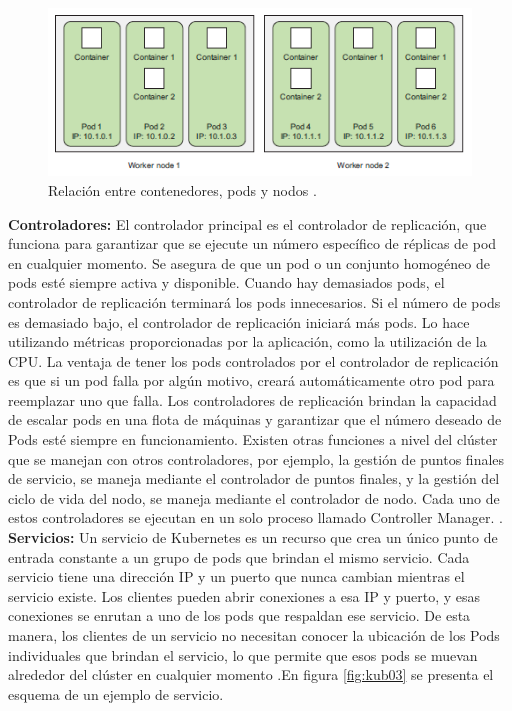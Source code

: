 \begin{figure}[htpb!]
	\centering
	\includegraphics[width=0.8\columnwidth]{images/kubernetes02.PNG}
	\caption{Relación entre contenedores, pods y nodos \cite{BOOK01}.}
	\label{fig:kub02}
\end{figure}

\textbf{Controladores:} El controlador principal es el controlador de replicación, que funciona para garantizar que se ejecute un número específico de réplicas de pod en cualquier momento. Se asegura de que un pod o un conjunto homogéneo de pods esté siempre activa y disponible. Cuando hay demasiados pods, el controlador de replicación terminará los pods innecesarios. Si el número de pods es demasiado bajo, el controlador de replicación iniciará más pods. Lo hace utilizando métricas proporcionadas por la aplicación, como la utilización de la CPU. La ventaja de tener los pods controlados por el controlador de replicación es que si un pod falla por algún motivo, creará automáticamente otro pod para reemplazar uno que falla. Los controladores de replicación brindan la capacidad de escalar pods en una flota de máquinas y garantizar que el número deseado de Pods esté siempre en funcionamiento. Existen otras funciones a nivel del clúster que se manejan con otros controladores, por ejemplo, la gestión de puntos finales de servicio, se maneja mediante el controlador de puntos finales, y la gestión del ciclo de vida del nodo, se maneja mediante el controlador de nodo. Cada uno de estos controladores se ejecutan en un solo proceso llamado Controller Manager. \cite{BOOK02,BOOK04}.\\

\textbf{Servicios:} Un servicio de Kubernetes es un recurso que crea un único punto de entrada constante a un grupo de pods que brindan el mismo servicio. Cada servicio tiene una dirección IP y un puerto que nunca cambian mientras el servicio existe. Los clientes pueden abrir conexiones a esa IP y puerto, y esas conexiones se enrutan a uno de los pods que respaldan ese servicio. De esta manera, los clientes de un servicio no necesitan conocer la ubicación de los Pods individuales que brindan el servicio, lo que permite que esos pods se muevan alrededor del clúster en cualquier momento \cite{BOOK01}.En figura \ref{fig:kub03} se presenta el esquema de un ejemplo de servicio.\\

